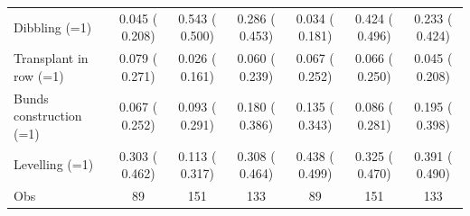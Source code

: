\begin{tabular}{lcccccc}
Dibbling (=1) &     0.045 (    0.208) &     0.543 (    0.500)\sym{*} &     0.286 (    0.453) &     0.034 (    0.181) &     0.424 (    0.496)\sym{*} &     0.233 (    0.424) \\
Transplant in row (=1) &     0.079 (    0.271) &     0.026 (    0.161) &     0.060 (    0.239) &     0.067 (    0.252) &     0.066 (    0.250) &     0.045 (    0.208) \\
Bunds construction (=1) &     0.067 (    0.252) &     0.093 (    0.291) &     0.180 (    0.386) &     0.135 (    0.343) &     0.086 (    0.281) &     0.195 (    0.398) \\
Levelling (=1) &     0.303 (    0.462) &     0.113 (    0.317) &     0.308 (    0.464) &     0.438 (    0.499) &     0.325 (    0.470) &     0.391 (    0.490) \\
\midrule
Obs &        89 &       151 &       133 &        89 &       151 &       133 \\
\bottomrule
\end{tabular}
